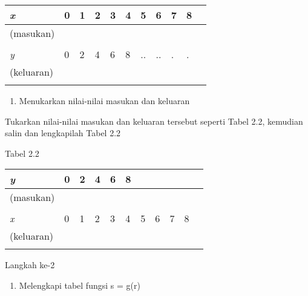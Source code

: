 \documentclass[11pt,fleqn]{book} %
\begin{document}
\noindent 

\begin{tabular}{|p{0.6in}|p{0.4in}|p{0.3in}|p{0.2in}|p{0.2in}|p{0.2in}|p{0.2in}|p{0.2in}|p{0.2in}|p{0.2in}|p{0.2in}|} \hline 
\textit{x}  & 0 & 1 & 2 & 3 & 4 & 5 & 6 & 7 & 8 \\ \hline 
 (masukan) &  &  &  &  &  &  &  &  &  \\ \hline 
 &  &  &  &  &  &  &  &  &  &  \\ \hline 
\textit{y}  & 0 & 2 & 4 & 6 & 8 & .. & .. & . & . \\ \hline 
 (keluaran) &  &  &  &  &  &  &  &  &  \\ \hline 
 &  &  &  &  &  &  &  &  &  &  \\ \hline 
\end{tabular}



\begin{enumerate}
\item  Menukarkan nilai-nilai masukan dan keluaran
\end{enumerate}

\noindent Tukarkan nilai-nilai masukan dan keluaran tersebut seperti Tabel 2.2, kemudian salin dan lengkapilah Tabel 2.2 

\noindent \textbf{}

\noindent Tabel 2.2

\noindent 

\begin{tabular}{|p{0.6in}|p{0.4in}|p{0.3in}|p{0.2in}|p{0.2in}|p{0.2in}|p{0.2in}|p{0.2in}|p{0.2in}|p{0.2in}|p{0.2in}|} \hline 
\textit{y}  & 0 & 2 & 4 & 6 & 8 &  &  &  &  \\ \hline 
 (masukan) &  &  &  &  &  &  &  &  &  \\ \hline 
 &  &  &  &  &  &  &  &  &  &  \\ \hline 
\textit{x}  & 0 & 1 & 2 & 3 & 4 & 5 & 6 & 7 & 8 \\ \hline 
 (keluaran) &  &  &  &  &  &  &  &  &  \\ \hline 
 &  &  &  &  &  &  &  &  &  &  \\ \hline 
\end{tabular}



\noindent 

\noindent 

\noindent Langkah ke-2

\noindent 

\noindent 

\begin{enumerate}
\item  Melengkapi tabel fungsi s = g(r)
\end{enumerate}
\end{document}
